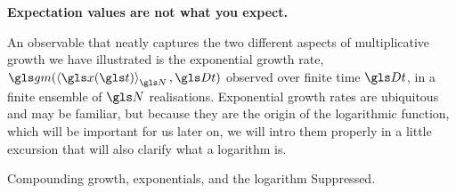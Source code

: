 \textbf{Expectation values are not what you expect.}

An observable that neatly captures the two different 
aspects of multiplicative growth we have illustrated is the exponential growth rate, $\gm(\ave{\x(\t)}_\N, \Dt)$ 
observed over finite time $\Dt$, in a finite ensemble
of $\N$ realisations. Exponential growth rates are ubiquitous and may be familiar, but because they are the origin of the logarithmic function, which will be important for us later on, we will intro them properly in a little excursion that will also clarify what a logarithm is.

\begin{excursion}{Compounding growth, exponentials, and the logarithm}
Suppressed.
%

\end{excursion}
